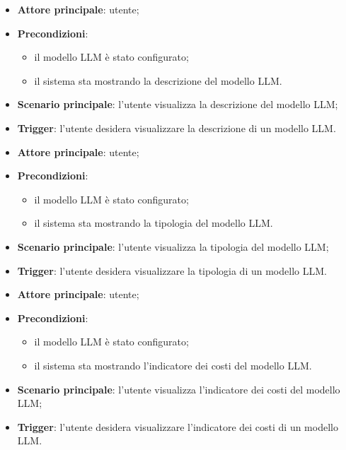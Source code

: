\documentclass[10pt, a4paper]{article}
\begin{document}
    \begin{itemize}
        \item \textbf{Attore principale}: utente;
        \item \textbf{Precondizioni}:
        \begin{itemize}
            \item il modello LLM è stato configurato;
            \item il sistema sta mostrando la descrizione del modello LLM.
        \end{itemize}
        \item \textbf{Scenario principale}: l'utente visualizza la descrizione del modello LLM;
        \item \textbf{Trigger}: l’utente desidera visualizzare la descrizione di un modello LLM.
    \end{itemize}

    \begin{itemize}
        \item \textbf{Attore principale}: utente;
        \item \textbf{Precondizioni}:
        \begin{itemize}
            \item il modello LLM è stato configurato;
            \item il sistema sta mostrando la tipologia del modello LLM.
        \end{itemize}
        \item \textbf{Scenario principale}: l'utente visualizza la tipologia del modello LLM;
        \item \textbf{Trigger}: l’utente desidera visualizzare la tipologia di un modello LLM.
    \end{itemize}

    \begin{itemize}
        \item \textbf{Attore principale}: utente;
        \item \textbf{Precondizioni}:
        \begin{itemize}
            \item il modello LLM è stato configurato;
            \item il sistema sta mostrando l'indicatore dei costi del modello LLM.
        \end{itemize}
        \item \textbf{Scenario principale}: l'utente visualizza l'indicatore dei costi del modello LLM;
        \item \textbf{Trigger}: l’utente desidera visualizzare l'indicatore dei costi di un modello LLM.
    \end{itemize}
\end{document}
